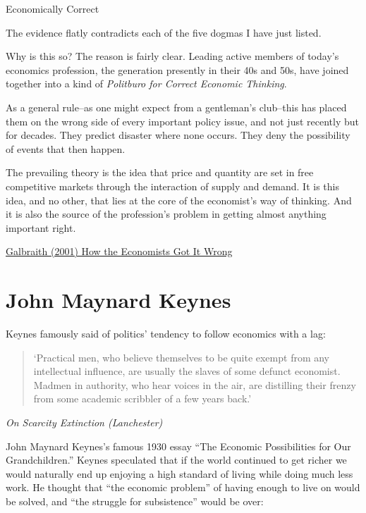 \documentclass[
]{book}
\begin{document}
Economically Correct

The evidence flatly contradicts each of the five dogmas I have just listed.

Why is this so? The reason is fairly clear. Leading active members of today's economics profession, the generation presently in their 40s and 50s, have joined together into a kind of \emph{Politburo for Correct Economic Thinking}.

As a general rule--as one might expect from a gentleman's club--this has placed them on the wrong side of every important policy issue, and not just recently but for decades. They predict disaster where none occurs. They deny the possibility of events that then happen.

The prevailing theory is the idea that price and quantity are set in free competitive markets through the interaction of supply and demand. It is this idea, and no other, that lies at the core of the economist's way of thinking. And it is also the source of the profession's problem in getting almost anything important right.

\href{https://prospect.org/features/econo\%20mists-got-wrong/}{Galbraith (2001) How the Economists Got It Wrong}

\hypertarget{john-maynard-keynes}{%
\section{John Maynard Keynes}\label{john-maynard-keynes}}

Keynes famously said of politics' tendency to follow economics with a lag:

\begin{quote}
`Practical men, who believe themselves to be quite exempt from any intellectual influence, are usually the slaves of some defunct economist. Madmen in authority, who hear voices in the air, are distilling their frenzy from some academic scribbler of a few years back.'
\end{quote}

\emph{On Scarcity Extinction (Lanchester)}

John Maynard Keynes's famous 1930 essay ``The Economic Possibilities for Our Grandchildren.'' Keynes speculated that if the world continued to get richer we would naturally end up enjoying a high standard of living while doing much less work. He thought that ``the economic problem'' of having enough to live on would be solved, and ``the struggle for subsistence'' would be over:
\end{document}
